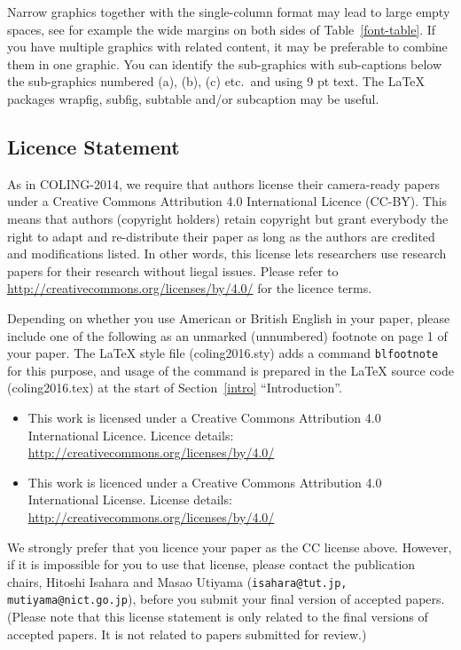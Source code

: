 \documentclass[11pt]{article}
\begin{document}
Narrow graphics together with the single-column format may lead to
large empty spaces,
see for example the wide margins on both sides of Table~\ref{font-table}.
If you have multiple graphics with related content, it may be
preferable to combine them in one graphic.
You can identify the sub-graphics with sub-captions below the
sub-graphics numbered (a), (b), (c) etc.\ and using 9 pt text.
The \LaTeX{} packages wrapfig, subfig, subtable and/or subcaption
may be useful.


\subsection{Licence Statement}
\label{licence}

As in COLING-2014, 
we require that authors license their
camera-ready papers under a
Creative Commons Attribution 4.0 International Licence
(CC-BY).
This means that authors (copyright holders) retain copyright but
grant everybody 
the right to adapt and re-distribute their paper 
as long as the authors are credited and modifications listed.
In other words, this license lets researchers use research papers for their research without liegal issues.
Please refer to 
\url{http://creativecommons.org/licenses/by/4.0/} for the
licence terms.  

Depending on whether you use American or British English in your
paper, please include one of the following as an unmarked
(unnumbered) footnote on page 1 of your paper.
The \LaTeX{} style file (coling2016.sty) adds a command
\texttt{blfootnote} for this purpose, and usage of the command is
prepared in the \LaTeX{} source code (coling2016.tex) at the start
of Section~\ref{intro} ``Introduction''.

\begin{itemize}
    \item  This work is licensed under a Creative Commons 
           Attribution 4.0 International Licence.
           Licence details:
           \url{http://creativecommons.org/licenses/by/4.0/}
    \item  This work is licenced under a Creative Commons 
           Attribution 4.0 International License.
           License details:
           \url{http://creativecommons.org/licenses/by/4.0/}
\end{itemize}

We strongly prefer that you licence your paper as the CC license
above. However, if it is impossible for you to use that license, please 
contact the publication chairs,
Hitoshi Isahara and Masao Utiyama
(\texttt{isahara@tut.jp, mutiyama@nict.go.jp}),
before you submit your final version of accepted papers. 
(Please note that this license statement is only related to the final versions of accepted papers. 
It is not related to papers submitted for review.)
\end{document}

